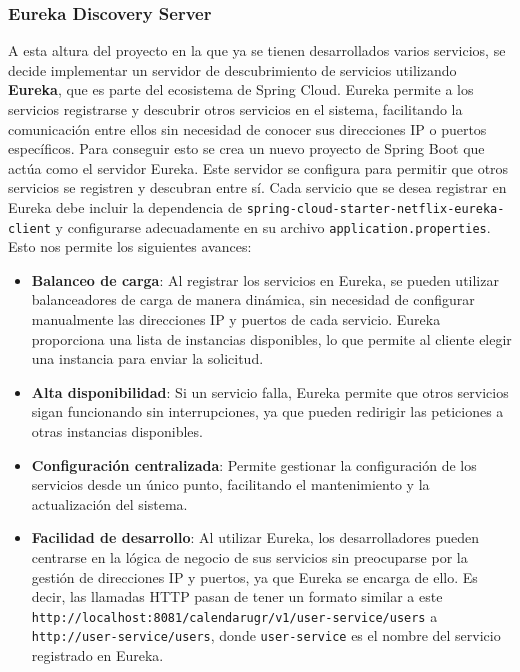\subsubsection{Eureka Discovery Server}
A esta altura del proyecto en la que ya se tienen desarrollados varios servicios, se decide implementar un servidor de descubrimiento de servicios utilizando \textbf{Eureka}, que es parte del ecosistema de Spring Cloud. Eureka permite a los servicios registrarse y descubrir otros servicios en el sistema, facilitando la comunicación entre ellos sin necesidad de conocer sus direcciones IP o puertos específicos.
\newline 
Para conseguir esto se crea un nuevo proyecto de Spring Boot que actúa como el servidor Eureka. Este servidor se configura para permitir que otros servicios se registren y descubran entre sí. Cada servicio que se desea registrar en Eureka debe incluir la dependencia de \texttt{spring-cloud-starter-netflix-eureka-client} y configurarse adecuadamente en su archivo \texttt{application.properties}.
\newline
Esto nos permite los siguientes avances:
\begin{itemize}
  \item \textbf{Balanceo de carga}: Al registrar los servicios en Eureka, se pueden utilizar balanceadores de carga de manera dinámica, sin necesidad de configurar manualmente las direcciones IP y puertos de cada servicio. Eureka proporciona una lista de instancias disponibles, lo que permite al cliente elegir una instancia para enviar la solicitud.
  \item \textbf{Alta disponibilidad}: Si un servicio falla, Eureka permite que otros servicios sigan funcionando sin interrupciones, ya que pueden redirigir las peticiones a otras instancias disponibles.
  \item \textbf{Configuración centralizada}: Permite gestionar la configuración de los servicios desde un único punto, facilitando el mantenimiento y la actualización del sistema.
  \item \textbf{Facilidad de desarrollo}: Al utilizar Eureka, los desarrolladores pueden centrarse en la lógica de negocio de sus servicios sin preocuparse por la gestión de direcciones IP y puertos, ya que Eureka se encarga de ello. Es decir, las llamadas HTTP pasan de tener un formato similar a este \texttt{http://localhost:8081/calendarugr/v1/user-service/users} a \texttt{http://user-service/users}, donde \texttt{user-service} es el nombre del servicio registrado en Eureka.
\end{itemize}

